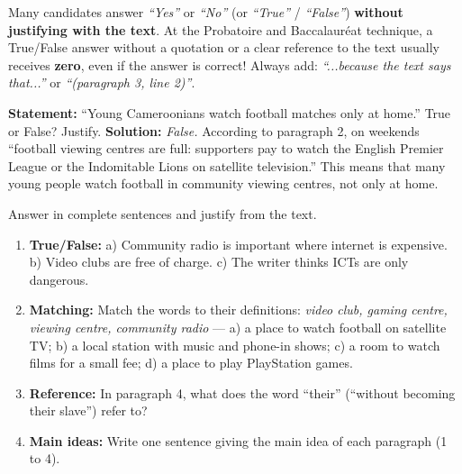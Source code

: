 \documentclass[11pt]{article}
\begin{document}
\begin{attention}
Many candidates answer \emph{``Yes''} or \emph{``No''} (or \emph{``True''} / \emph{``False''}) \textbf{without justifying with the text}. At the Probatoire and Baccalauréat technique, a True/False answer without a quotation or a clear reference to the text usually receives \textbf{zero}, even if the answer is correct! Always add: \emph{``...because the text says that...''} or \emph{``(paragraph 3, line 2)''}.
\end{attention}

\begin{exoresolu}
\textbf{Statement:} ``Young Cameroonians watch football matches only at home.'' True or False? Justify.
\tcblower
\textbf{Solution:} \emph{False.} According to paragraph 2, on weekends ``football viewing centres are full: supporters pay to watch the English Premier League or the Indomitable Lions on satellite television.'' This means that many young people watch football in community viewing centres, not only at home.
\end{exoresolu}

\begin{exercice}
Answer in complete sentences and justify from the text.
\begin{enumerate}
\item \textbf{True/False:} a) Community radio is important where internet is expensive. b) Video clubs are free of charge. c) The writer thinks ICTs are only dangerous.
\item \textbf{Matching:} Match the words to their definitions: \emph{video club, gaming centre, viewing centre, community radio} — a) a place to watch football on satellite TV; b) a local station with music and phone-in shows; c) a room to watch films for a small fee; d) a place to play PlayStation games.
\item \textbf{Reference:} In paragraph 4, what does the word ``their'' (``without becoming their slave'') refer to?
\item \textbf{Main ideas:} Write one sentence giving the main idea of each paragraph (1 to 4).
\end{enumerate}
\end{exercice}
\end{document}

